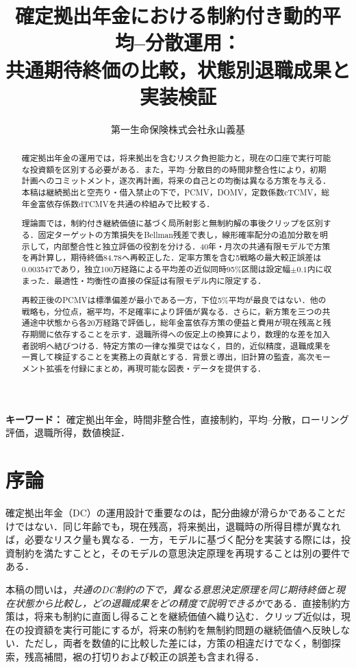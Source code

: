 \documentclass[11pt,a4paper]{article}
\title{確定拠出年金における制約付き動的平均--分散運用：\\\large 共通期待終価の比較，状態別退職成果と実装検証}
\author{第一生命保険株式会社\quad 永山義基}
\date{}
\numberwithin{equation}{section}
\numberwithin{table}{section}
\numberwithin{figure}{section}
\theoremstyle{plain}
\theoremstyle{definition}
\begin{document}
\maketitle
\begin{abstract}
確定拠出年金の運用では，将来拠出を含むリスク負担能力と，現在の口座で実行可能な投資額を区別する必要がある．また，平均--分散目的の時間非整合性により，初期計画へのコミットメント，逐次再計画，将来の自己との均衡は異なる方策を与える．本稿は継続拠出と空売り・借入禁止の下で，PCMV，DOMV，定数係数cTCMV，総年金富依存係数dTCMVを共通の枠組みで比較する．

理論面では，制約付き継続価値に基づく局所射影と無制約解の事後クリップを区別する．固定ターゲットの方策損失をBellman残差で表し，線形確率配分の追加分散を明示して，内部整合性と独立評価の役割を分ける．40年・月次の共通有限モデルで方策を再計算し，期待終価84.78へ再較正した．定率方策を含む5戦略の最大較正誤差は0.003547であり，独立100万経路による平均差の近似同時95\%区間は設定幅$\pm0.1$内に収まった．最適性・均衡性の直接の保証は有限モデル内に限定する．

再較正後のPCMVは標準偏差が最小である一方，下位5\%平均が最良ではない．他の戦略も，分位点，裾平均，不足確率により評価が異なる．さらに，新方策を三つの共通途中状態から各20万経路で評価し，総年金富依存方策の便益と費用が現在残高と残存期間に依存することを示す．退職所得への仮定上の換算により，数理的な差を加入者説明へ結びつける．特定方策の一律な推奨ではなく，目的，近似精度，退職成果を一貫して検証することを実務上の貢献とする．背景と導出，旧計算の監査，高次モーメント拡張を付録にまとめ，再現可能な図表・データを提供する．
\end{abstract}
\noindent\textbf{キーワード：} 確定拠出年金，時間非整合性，直接制約，平均--分散，ローリング評価，退職所得，数値検証．
\clearpage\tableofcontents\clearpage
\FloatBarrier
\section{序論}
\label{sec:introduction}
確定拠出年金（DC）の運用設計で重要なのは，配分曲線が滑らかであることだけではない．同じ年齢でも，現在残高，将来拠出，退職時の所得目標が異なれば，必要なリスク量も異なる．一方，モデルに基づく配分を実装する際には，投資制約を満たすことと，そのモデルの意思決定原理を再現することは別の要件である．

本稿の問いは，\emph{共通のDC制約の下で，異なる意思決定原理を同じ期待終価と現在状態から比較し，どの退職成果をどの精度で説明できるか}である．直接制約方策は，将来も制約に直面し得ることを継続価値へ織り込む．クリップ近似は，現在の投資額を実行可能にするが，将来の制約を無制約問題の継続価値へ反映しない．ただし，両者を数値的に比較した差には，方策の相違だけでなく，制御探索，残高補間，裾の打切りおよび較正の誤差も含まれ得る．
\end{document}

